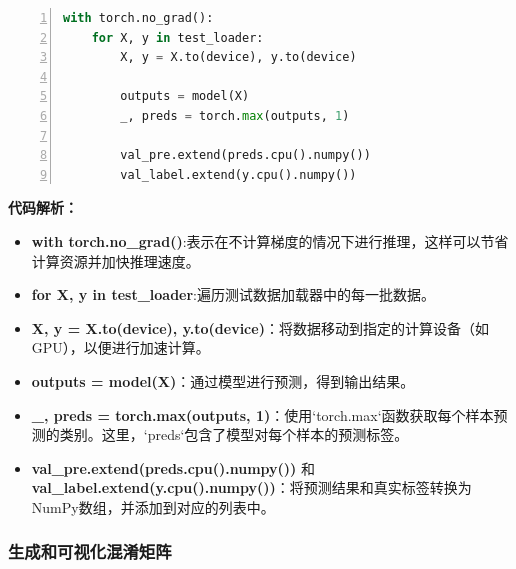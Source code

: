 \begin{lstlisting}[language={python},label={遍历测试数据并收集结果},caption={遍历测试数据并收集结果}, basicstyle=\footnotesize\ttfamily, breaklines=true, numbers=left, frame=single,keepspaces=true,showstringspaces=false]
with torch.no_grad():
    for X, y in test_loader:
        X, y = X.to(device), y.to(device)
        
        outputs = model(X)
        _, preds = torch.max(outputs, 1)
        
        val_pre.extend(preds.cpu().numpy())
        val_label.extend(y.cpu().numpy())
\end{lstlisting}
\textbf{代码解析：}
\begin{itemize}
    \item \textbf{with torch.no\_grad()}:表示在不计算梯度的情况下进行推理，这样可以节省计算资源并加快推理速度。
    \item \textbf{for X, y in test\_loader}:遍历测试数据加载器中的每一批数据。
    \item \textbf{X, y = X.to(device), y.to(device)}：将数据移动到指定的计算设备（如GPU），以便进行加速计算。
    \item \textbf{outputs = model(X)}：通过模型进行预测，得到输出结果。
    \item \textbf{\_, preds = torch.max(outputs, 1)}：使用`torch.max`函数获取每个样本预测的类别。这里，`preds`包含了模型对每个样本的预测标签。
    \item \textbf{val\_pre.extend(preds.cpu().numpy())} 和 \textbf{val\_label.extend(y.cpu().numpy())}：将预测结果和真实标签转换为NumPy数组，并添加到对应的列表中。
\end{itemize}

\subsubsection{生成和可视化混淆矩阵}


